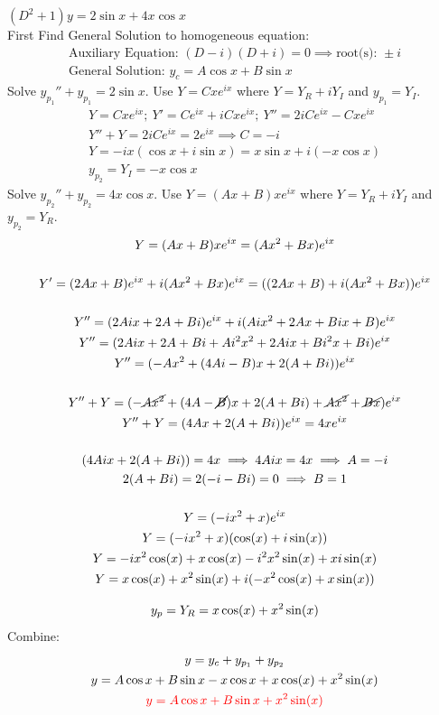 \item [36.] $(D^2+1)y=2\sin x + 4x \cos x$\\[2mm]
First Find General Solution to homogeneous equation:
\begin{gather*}
    \text{Auxiliary Equation: } (D-i)(D+i)=0
    \implies \text{root(s): } \pm i\\
    \text{General Solution: } y_c=A\cos x + B \sin x
\end{gather*}
Solve $y_{p_1}''+y_{p_1}=2\sin x$. Use $Y=Cxe^{ix}$ where $Y=Y_R +iY_I$ and $y_{p_1}=Y_I$.
\begin{gather*}
    Y=Cxe^{ix};\:Y'=Ce^{ix}+iCxe^{ix};\:Y''=2iCe^{ix}-Cxe^{ix}\\
    Y''+Y=2iCe^{ix}=2e^{ix} \implies C=-i\\
    Y = -ix(\cos x+ i\sin x) = x \sin x +i(-x\cos x)\\
    y_{p_2} = Y_I =  -x \cos x
\end{gather*}
Solve $y_{p_2}''+y_{p_2}=4x \cos x$. Use $Y=(Ax+B)xe^{ix}$ where $Y=Y_R +iY_I$ and $y_{p_2}=Y_R$.
\begin{gather*}
    Y = (Ax+B)xe^{ix}=(Ax^2+Bx)e^{ix}\\[5mm]
    Y' = (2Ax+B)e^{ix}+i(Ax^2+Bx)e^{ix} = ((2Ax+B)+i(Ax^2+Bx))e^{ix}\\[5mm]
    Y'' = (2Aix+2A+Bi)e^{ix}+i(Aix^2+2Ax+Bix+B)e^{ix}\\
    Y'' = (2Aix+2A+Bi+Ai^2x^2+2Aix+Bi^2x+Bi)e^{ix}\\
    Y'' = (-Ax^2+(4Ai-B)x+2(A+Bi))e^{ix}\\[5mm]
    Y''+Y=(-\cancel{Ax^2}+(4A-\cancel{B})x+2(A+Bi)+\cancel{Ax^2}+\cancel{Bx})e^{ix}\\
    Y''+Y=(4Ax+2(A+Bi))e^{ix}=4xe^{ix}\\[5mm]
    (4Aix+2(A+Bi))=4x \implies 4Aix = 4x \implies A = -i\\
    2(A+Bi) = 2(-i-Bi) = 0 \implies B = 1\\[5mm]
    Y = (-ix^2+x)e^{ix}\\
    Y = (-ix^2+x)(\cos(x)+i\sin(x))\\
    Y = -ix^2\cos(x)+x\cos(x)-i^2x^2\sin(x)+xi\sin(x)\\
    Y = x\cos(x)+x^2\sin(x)+i(-x^2\cos(x)+x\sin(x))\\[3mm]
    y_p = Y_R = x\cos(x)+x^2\sin(x)
\end{gather*}
Combine:
\begin{gather*}
    y = y_c+y_{p_1}+y_{p_2}\\
    y = 
    A\cos x + B \sin x
    -x \cos x
    +x\cos(x)+x^2\sin(x)\\
    \textcolor{red}{y = A\cos x + B \sin x+x^2\sin(x)}
\end{gather*}
